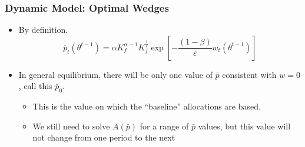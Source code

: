 \documentclass{beamer}
\begin{document}
    
    

\begin{frame}
    \frametitle{Dynamic Model: Optimal Wedges}

    \begin{itemize}
        \item By definition, 
        \begin{equation*}
            \overline{p}_{t}\left(\theta^{t-1}\right)=\alpha K_{f}^{\alpha-1}K_{f}^{\frac{1}{\varepsilon}}\exp\left[-\frac{\left(1-\beta\right)}{\varepsilon}w_{t}\left(\theta^{t-1}\right)\right]  
        \end{equation*}
        \item In general equilibrium, there will be only one value of \( \bar{p} \) consistent with \( w=0 \), call this \( \bar{p}_0 \). 
        \begin{itemize}
            \item This is the value on which the ``baseline'' allocations are based.
            \item We still need to solve \( A\left( \bar{p} \right) \) for a range of \( \bar{p} \) values, but this value will not change from one period to the next 
        \end{itemize}
    \end{itemize}

\end{frame}
\end{document}
